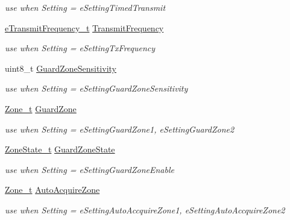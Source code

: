 \begin{DoxyCompactItemize}
\begin{DoxyCompactList}\small\item\em use when \textquotesingle{}Setting\textquotesingle{} = e\+Setting\+Timed\+Transmit \end{DoxyCompactList}\item 
\mbox{\hyperlink{namespace_quantum_lib_af636ea7f14f5a62bfcfc1132c9c78019}{e\+Transmit\+Frequency\+\_\+t}} \mbox{\hyperlink{union_quantum_lib_1_1_setting_data__t_1_1_value__t_adc3295f4b87ae511f67eca80508d1149}{Transmit\+Frequency}}
\begin{DoxyCompactList}\small\item\em use when \textquotesingle{}Setting\textquotesingle{} = e\+Setting\+Tx\+Frequency \end{DoxyCompactList}\item 
uint8\+\_\+t \mbox{\hyperlink{union_quantum_lib_1_1_setting_data__t_1_1_value__t_ad78adafa496cc81ea3ad106034b59a54}{Guard\+Zone\+Sensitivity}}
\begin{DoxyCompactList}\small\item\em use when \textquotesingle{}Setting\textquotesingle{} = e\+Setting\+Guard\+Zone\+Sensitivity \end{DoxyCompactList}\item 
\mbox{\hyperlink{struct_quantum_lib_1_1_zone__t}{Zone\+\_\+t}} \mbox{\hyperlink{union_quantum_lib_1_1_setting_data__t_1_1_value__t_ab35d55c13e6aa148918fa05048a2a3fe}{Guard\+Zone}}
\begin{DoxyCompactList}\small\item\em use when \textquotesingle{}Setting\textquotesingle{} = e\+Setting\+Guard\+Zone1, e\+Setting\+Guard\+Zone2 \end{DoxyCompactList}\item 
\mbox{\hyperlink{struct_quantum_lib_1_1_zone_state__t}{Zone\+State\+\_\+t}} \mbox{\hyperlink{union_quantum_lib_1_1_setting_data__t_1_1_value__t_ad17eb70fdfe54a4d8286f264b4b2f73a}{Guard\+Zone\+State}}
\begin{DoxyCompactList}\small\item\em use when \textquotesingle{}Setting\textquotesingle{} = e\+Setting\+Guard\+Zone\+Enable \end{DoxyCompactList}\item 
\mbox{\hyperlink{struct_quantum_lib_1_1_zone__t}{Zone\+\_\+t}} \mbox{\hyperlink{union_quantum_lib_1_1_setting_data__t_1_1_value__t_acf21e1a767d1965c357b0855e2e4386b}{Auto\+Acquire\+Zone}}
\begin{DoxyCompactList}\small\item\em use when \textquotesingle{}Setting\textquotesingle{} = e\+Setting\+Auto\+Accquire\+Zone1, e\+Setting\+Auto\+Accquire\+Zone2 \end{DoxyCompactList}\item 

\end{DoxyCompactItemize}
